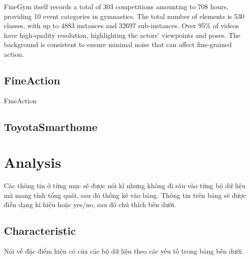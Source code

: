 \documentclass[a4paper]{article}
\begin{document}
FineGym itself records a total of 303 competitions amounting to 708 hours, providing 10 event categories in gymnastics. The total number of elements is 530 classes, with up to 4883 instances and 32697 sub-instances. Over 95\% of videos have high-quality resolution, highlighting the actors' viewpoints and poses. The background is consistent to ensure minimal noise that can affect fine-grained action.
\subsection{FineAction}
FineAction 
\subsection{ToyotaSmarthome}

\section{Analysis}
Các thông tin ở từng mục sẽ được nói kĩ nhưng không đi sâu vào từng bộ dữ liệu mà mang tính tổng quát, sau đó thống kê vào bảng. Thông tin trên bảng sẽ được điền dạng kí hiệu hoặc yes/no, sau đó chú thích bên dưới.

\subsection{Characteristic}
Nói về đặc điểm hiện có của các bộ dữ liệu theo các yếu tố trong bảng bên dưới.

\newcommand{\cmark}{\ding{51}}%
\newcommand{\xmark}{\ding{55}}%
\end{document}
